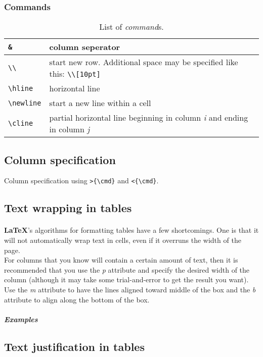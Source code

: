 \documentclass[11pt,a4paper]{article}
\begin{document}
\subsubsection{Commands}
\begin{table}[htbp]
	\centering
	\begin{tabular}{| l | p{10cm} |}
	\hline
	\verb|&| & column seperator \\ \hline
	\verb|\\| & start new row. Additional space may be specified like this: \verb|\\[10pt]| \\ \hline
	\verb|\hline| & horizontal line \\ \hline
	\verb|\newline| & start a new line within a cell \\ \hline
	\verb|\cline| & partial horizontal line beginning in column \emph{i} and ending in column \emph{j} \\ \hline
	\end{tabular}
\caption{List of \emph{command}s.}
\label{tabular_commands}
\end{table}

\subsection{Column specification}
Column specification using \verb|>{\cmd}| and \verb|<{\cmd}|.

\subsection[Text wrapping]{Text wrapping in tables}
\paragraph{}
\textbf{\LaTeX{}}'s algorithms for formatting tables have a few shortcomings.
One is that it will not automatically wrap text in cells, even if it overruns
the width of the page.\\
For columns that you know will contain a certain amount
of text, then it is recommended that you use the \emph{p} attribute and specify
the desired width of the column (although it may take some trial-and-error to
get the result you want). Use the \emph{m} attribute to have the lines aligned
toward middle of the box and the \emph{b} attribute to align along the bottom
of the box.
\subparagraph{Examples}
\subsection[Text justfication]{Text justification in tables}
\end{document}
